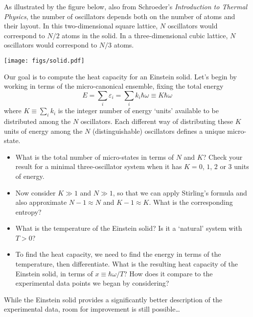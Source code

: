 \documentclass[12 pt]{article} %
\newcommand{\eps}{\ensuremath{\varepsilon} }
\newcommand{\om}{\ensuremath{\omega} }
\begin{document}
As illustrated by the figure below, also from Schroeder's \textit{Introduction to Thermal Physics}, the number of oscillators depends both on the number of atoms and their layout.
In this two-dimensional square lattice, $N$ oscillators would correspond to $N / 2$ atoms in the solid.
In a three-dimensional cubic lattice, $N$ oscillators would correspond to $N / 3$ atoms. \\[-24 pt]
\begin{center}\texttt{[image: figs/solid.pdf]}\end{center}

Our goal is to compute the heat capacity for an Einstein solid.
Let's begin by working in terms of the micro-canonical ensemble, fixing the total energy
\begin{equation*}
  E = \sum_i \eps_i = \sum_i k_i\hbar\om \equiv K\hbar\om
\end{equation*}
where $K \equiv \sum_i k_i$ is the integer number of energy `units' available to be distributed among the $N$ oscillators.
Each different way of distributing these $K$ units of energy among the $N$ (distinguishable) oscillators defines a unique micro-state.

\begin{itemize}
  \item What is the total number of micro-states in terms of $N$ and $K$?
        Check your result for a minimal three-oscillator system when it has $K = 0$, $1$, $2$ or $3$ units of energy.

  \item Now consider $K \gg 1$ and $N \gg 1$, so that we can apply Stirling's formula and also approximate $N - 1 \approx N$ and $K - 1 \approx K$.
        What is the corresponding entropy?

  \item What is the temperature of the Einstein solid?
        Is it a `natural' system with $T > 0$?

  \item To find the heat capacity, we need to find the energy in terms of the temperature, then differentiate.
        What is the resulting heat capacity of the Einstein solid, in terms of $x \equiv \hbar \om / T$?
        How does it compare to the experimental data points we began by considering?
\end{itemize}

While the Einstein solid provides a significantly better description of the experimental data, room for improvement is still possible\dots
\end{document}
